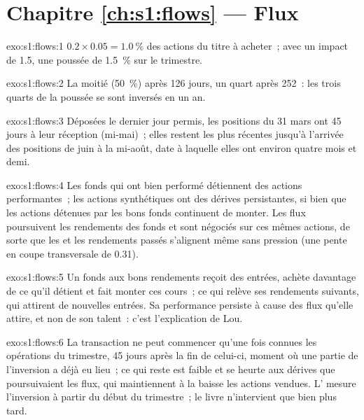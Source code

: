 \section*{Chapitre \ref{ch:s1:flows} --- Flux}

\begin{solution}{exo:s1:flows:1}
$0.2 \times 0.05 = 1.0~\%$ des actions du titre à acheter~; avec un impact de 1.5, une poussée de 1.5~\% sur le trimestre.
\end{solution}

\begin{solution}{exo:s1:flows:2}
La moitié (50~\%) après 126 jours, un quart après 252~: les trois quarts de la poussée se sont inversés en un an.
\end{solution}

\begin{solution}{exo:s1:flows:3}
Déposées le dernier jour permis, les positions du 31 mars ont 45 jours à leur réception (mi-mai)~; elles restent les plus récentes jusqu'à l'arrivée des positions de juin
à la mi-août, date à laquelle elles ont environ quatre mois et demi.
\end{solution}

\begin{solution}{exo:s1:flows:4}
Les fonds qui ont bien performé détiennent des actions performantes~; les actions synthétiques ont des dérives persistantes, si bien que les actions détenues par les bons fonds continuent de monter. Les flux poursuivent les
rendements des fonds et sont négociés sur ces mêmes actions, de sorte que les  et les rendements passés s'alignent même sans pression (une pente en coupe transversale de 0.31).
\end{solution}

\begin{solution}{exo:s1:flows:5}
Un fonds aux bons rendements reçoit des entrées, achète davantage de ce qu'il détient et fait monter ces cours~; ce qui relève ses rendements suivants, qui attirent de nouvelles entrées.
Sa performance persiste à cause des flux qu'elle attire, et non de son talent~: c'est l'explication de Lou.
\end{solution}

\begin{solution}{exo:s1:flows:6}
La transaction ne peut commencer qu'une fois connues les opérations du trimestre, 45 jours après la fin de celui-ci, moment où une partie de l'inversion a déjà eu lieu~; ce qui reste est
faible et se heurte aux dérives que poursuivaient les flux, qui maintiennent à la baisse les actions vendues. L' mesure l'inversion à partir du
début du trimestre~; le livre n'intervient que bien plus tard.
\end{solution}

